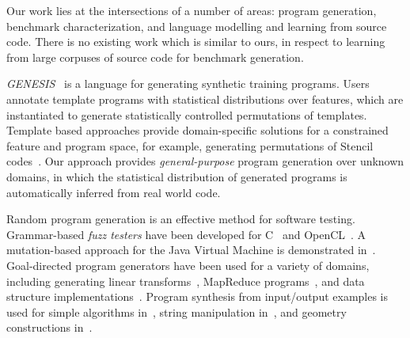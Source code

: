 %
%
%
%
%
%




Our work lies at the intersections of a number of areas: program generation, benchmark characterization, and language modelling and learning from source code. There is no existing work which is similar to ours, in respect to learning from large corpuses of source code for benchmark generation.

\emph{GENESIS}~\cite{Chiu2015} is a language for generating synthetic training programs. Users annotate template programs with statistical distributions over features, which are instantiated to generate statistically controlled permutations of templates. Template based approaches provide domain-specific solutions for a constrained feature and program space, for example, generating permutations of Stencil codes~\cite{Garvey2015b,Cummins2015a}. Our approach provides \emph{general-purpose} program generation over unknown domains, in which the statistical distribution of generated programs is automatically inferred from real world code.

Random program generation is an effective method for software testing. Grammar-based \emph{fuzz testers} have been developed for C~\cite{Yang2012} and OpenCL~\cite{Lidbury2015a}. A mutation-based approach for the Java Virtual Machine is demonstrated in~\cite{Chena}. Goal-directed program generators have been used for a variety of domains, including generating linear transforms~\cite{Voronenko2009}, MapReduce programs~\cite{Smith}, and data structure implementations~\cite{Loncaric2016}. Program synthesis from input/output examples is used for simple algorithms in~\cite{Zaremba2015a}, string manipulation in~\cite{Gulwani2011}, and geometry constructions in~\cite{Gulwani2012}.

